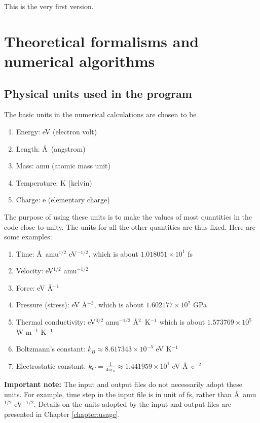 \documentclass[12pt,a4paper]{report}
\begin{document}
This is the very first version.


\chapter{Theoretical formalisms and numerical algorithms}

\section{Physical units used in the program}

The basic units in the numerical calculations are chosen to be
\begin{enumerate}
\item Energy: eV (electron volt)
\item Length: \AA~(angstrom)
\item Mass: amu (atomic mass unit)
\item Temperature: K (kelvin)
\item Charge: e (elementary charge)
\end{enumerate}
The purpose of using these units is to make the values of most quantities in the code close to unity. The units for all the other quantities are thus fixed. Here are some examples:
\begin{enumerate}
\item Time: \AA~amu$^{1/2}$ eV$^{-1/2}$, which is about $1.018051 \times 10^{1}$ fs
\item Velocity: eV$^{1/2}$ amu$^{-1/2}$
\item Force: eV \AA$^{-1}$
\item Pressure (stress): eV \AA$^{-3}$, which is about $1.602177 \times 10^{2}$ GPa
\item Thermal conductivity: eV$^{3/2}$ amu$^{-1/2}$ \AA$^{2}$~K$^{-1}$
      which is about $1.573769 \times 10^{5}$ W m$^{-1}$ K$^{-1}$
\item Boltzmann's constant: $k_B \approx 8.617343 \times 10^{-5}$ eV K$^{-1}$
\item Electrostatic constant:
$k_C = \frac{1}{4\pi\epsilon_0} \approx 1.441959 \times 10^{1}$ eV \AA~e$^{-2}$
\end{enumerate}

\textbf{Important note:}
The input and output files do not necessarily adopt these units. For example, time step in the input file is in unit of fs, rather than \AA~amu$^{1/2}$ eV$^{-1/2}$. Details on the units adopted by the input and output files are presented in Chapter \ref{chapter:usage}.
\end{document}
